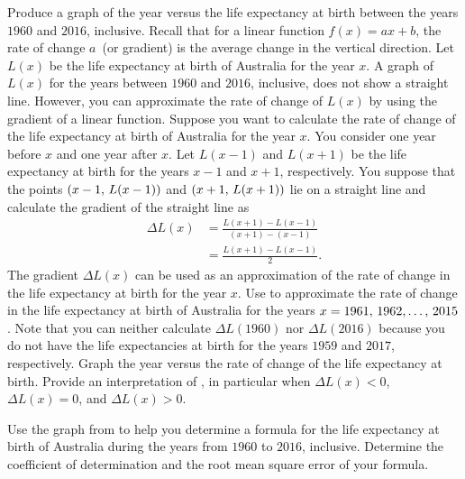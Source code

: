\documentclass[a4paper,oneside,12pt]{article}
\begin{document}
\begin{problem}
\begin{packedenum}
  \item\label{subprob:logarithm:Australia_life_expectancy}
    Produce a graph of the year versus the life expectancy at birth
    between the years $1960$ and $2016$, inclusive.  Recall that for a
    linear function $f(x) = ax + b$, the rate of change $a$~(or
    gradient) is the average change in the vertical direction.  Let
    $L(x)$ be the life expectancy at birth of Australia for the year
    $x$.  A graph of $L(x)$ for the years between $1960$ and $2016$,
    inclusive, does not show a straight line.  However, you can
    approximate the rate of change of $L(x)$ by using the gradient of
    a linear function.  Suppose you want to calculate the rate of
    change of the life expectancy at birth of Australia for the year
    $x$.  You consider one year before $x$ and one year after $x$.
    Let $L(x - 1)$ and $L(x + 1)$ be the life expectancy at birth for
    the years $x - 1$ and $x + 1$, respectively.  You suppose that the
    points $\left\lparen{x-1},\, {L(x-1)}\right\rparen$ and $\left\lparen{x+1},\, {L(x+1)}\right\rparen$ lie on a
    straight line and calculate the gradient of the straight line as
    \begin{equation}
    \label{eqn:logarithm:Australia_rate_of_change_life_expectancy}
    \begin{aligned}
    \Delta L(x)
    &=
    \frac{
      L(x + 1) - L(x - 1)
    }{
      (x + 1) - (x - 1)
    } \\[4pt]
    &=
    \frac{
      L(x + 1) - L(x - 1)
    }{
      2
    }.
    \end{aligned}
    \end{equation}
    The gradient $\Delta L(x)$ can be used as an approximation of the
    rate of change in the life expectancy at birth for the year $x$.
    Use
    to approximate the rate of change in the life expectancy at birth
    of Australia for the years $x = {1961},\, {1962}, \dots,\, {2015}$.  Note
    that you can neither calculate $\Delta L(1960)$ nor
    $\Delta L(2016)$ because you do not have the life expectancies at
    birth for the years $1959$ and $2017$, respectively.  Graph the
    year versus the rate of change of the life expectancy at birth.
    Provide an interpretation of
    ,
    in particular when $\Delta L(x) < 0$, $\Delta L(x) = 0$, and
    $\Delta L(x) > 0$.

  \item\label{subprob:logarithm:Australia_life_expectancy_formula}
    Use the graph
    from  to help
    you determine a formula for the life expectancy at birth of
    Australia during the years from $1960$ to $2016$, inclusive.
    Determine the coefficient of determination and the root mean
    square error of your formula.


\end{packedenum}
\end{problem}
\end{document}
